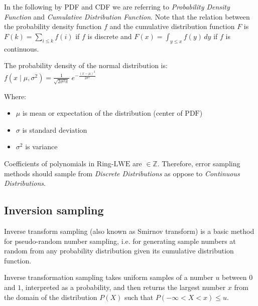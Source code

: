 
In the following by PDF and CDF we are referring to \textit{Probability Density Function} and \textit{Cumulative Distribution Function}. Note that the relation between the probability density function $f$ and the cumulative distribution function $F$ is $F(k) = \sum_{i \le k} f(i)$ if $f$ is discrete and  $F(x) = \int_{y \le x} f(y)\,dy$ if $f$ is continuous.



\begin{definition}
\normalfont
The probability density of the normal distribution is:
$f(x\;|\;\mu ,\sigma ^{2})={\frac {1}{\sqrt {2\sigma ^{2}\pi }}}\;e^{-{\frac {(x-\mu )^{2}}{2\sigma ^{2}}}}$

Where:
\begin{itemize}
    \item $\mu$ is mean or expectation of the distribution (center of $\mathrm{PDF}$)
    \item $\sigma$ is standard deviation
    \item $\sigma^{2}$ is variance
\end{itemize}
\end{definition}

\begin{plain}
\normalfont
Coefficients of polynomials in Ring-$\mathrm{LWE}$ are $\in \mathbb{Z}$. Therefore, error sampling methods should sample from \textit{Discrete Distributions} as oppose to \textit{Continuous Distributions}.
\end{plain}

\subsection{Inversion sampling}
Inverse transform sampling (also known as Smirnov transform) is a basic method for pseudo-random number sampling, i.e. for generating sample numbers at random from any probability distribution given its cumulative distribution function.

Inverse transformation sampling takes uniform samples of a number $u$ between $0$ and $1$, interpreted as a probability, and then returns the largest number $x$ from the domain of the distribution $P(X)$ such that $P(-\infty <X<x)\leq u$.

